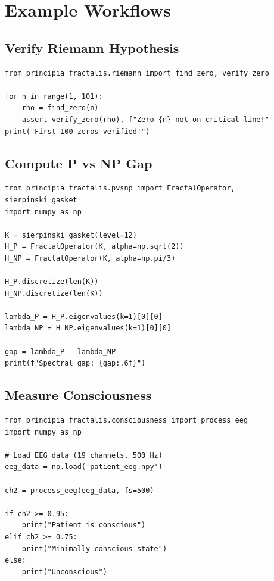 \section{Example Workflows}

\subsection{Verify Riemann Hypothesis}

\begin{verbatim}
from principia_fractalis.riemann import find_zero, verify_zero

for n in range(1, 101):
    rho = find_zero(n)
    assert verify_zero(rho), f"Zero {n} not on critical line!"
print("First 100 zeros verified!")
\end{verbatim}

\subsection{Compute P vs NP Gap}

\begin{verbatim}
from principia_fractalis.pvsnp import FractalOperator, sierpinski_gasket
import numpy as np

K = sierpinski_gasket(level=12)
H_P = FractalOperator(K, alpha=np.sqrt(2))
H_NP = FractalOperator(K, alpha=np.pi/3)

H_P.discretize(len(K))
H_NP.discretize(len(K))

lambda_P = H_P.eigenvalues(k=1)[0][0]
lambda_NP = H_NP.eigenvalues(k=1)[0][0]

gap = lambda_P - lambda_NP
print(f"Spectral gap: {gap:.6f}")
\end{verbatim}

\subsection{Measure Consciousness}

\begin{verbatim}
from principia_fractalis.consciousness import process_eeg
import numpy as np

# Load EEG data (19 channels, 500 Hz)
eeg_data = np.load('patient_eeg.npy')

ch2 = process_eeg(eeg_data, fs=500)

if ch2 >= 0.95:
    print("Patient is conscious")
elif ch2 >= 0.75:
    print("Minimally conscious state")
else:
    print("Unconscious")
\end{verbatim}

